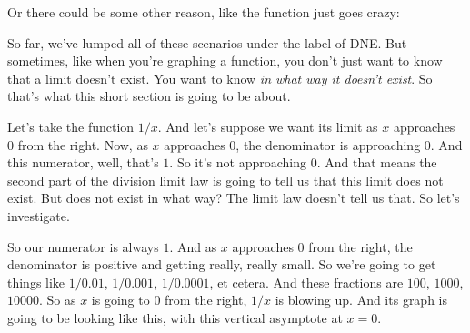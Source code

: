 \documentclass[pdftex, brazil, 12pt, twoside]{article}
\begin{document}
Or there could be some other reason, like the function just
goes crazy:

\begin{figure}[H]
  \begin{center}
  \end{center}
\end{figure}

So far, we've lumped all of these scenarios
under the label of DNE.
But sometimes, like when you're graphing a function,
you don't just want to know that a limit doesn't exist.
You want to know \emph{in what way it doesn't exist}.
So that's what this short section is going to be about.

Let's take the function $1/x$.
And let's suppose we want its limit as $x$ approaches $0$
from the right.
Now, as $x$ approaches $0$, the denominator is approaching $0$.
And this numerator, well, that's $1$.
So it's not approaching $0$.
And that means the second part of the division limit law
is going to tell us that this limit does not exist.
But does not exist in what way?
The limit law doesn't tell us that.
So let's investigate.

So our numerator is always $1$.
And as $x$ approaches $0$ from the right,
the denominator is positive and getting really, really small.
So we're going to get things like $1/0.01$, $1/0.001$,
$1/0.0001$, et cetera.
And these fractions are $100$, $1000$, $10000$.
So as $x$ is going to $0$ from the right, $1/x$ is blowing up.
And its graph is going to be looking
like this, with this vertical asymptote at $x = 0$.
\end{document}
